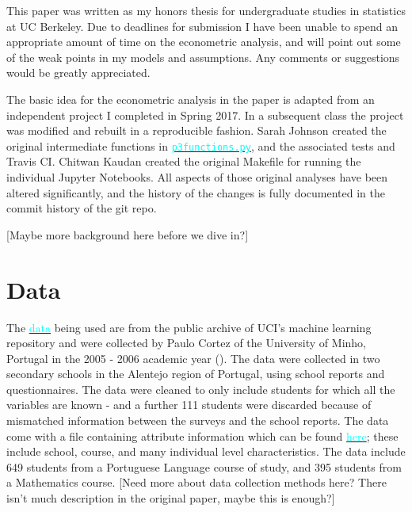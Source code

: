 \documentclass[12pt]{article}
\newcommand{\inlinecode}{\texttt}
\begin{document}
This paper was written as my honors thesis for undergraduate studies in statistics at UC Berkeley. Due to deadlines for submission I have been unable to spend an appropriate amount of time on the econometric analysis, and will point out some of the weak points in my models and assumptions. Any comments or suggestions would be greatly appreciated. 

The basic idea for the econometric analysis in the paper is adapted from an independent project I completed in Spring 2017. In a subsequent class the project was modified and rebuilt in a reproducible fashion. Sarah Johnson created the original intermediate functions in \href{https://github.com/nadavtadelis/Reproducible_Metrics/blob/master/p3functions.py}{\textcolor{cyan}{\inlinecode{p3functions.py}}}, and the associated tests and Travis CI. Chitwan Kaudan created the original Makefile for running the individual Jupyter Notebooks. All aspects of those original analyses have been altered significantly, and the history of the changes is fully documented in the commit history of the git repo.

\textcolor{BrickRed}{[Maybe more background here before we dive in?]}


\newpage
\section{Data}
The \href{https://archive.ics.uci.edu/ml/datasets/Student+Performance#}{\textcolor{cyan}{data}} being used are from the public archive of UCI's machine learning repository and were collected by Paulo Cortez of the University of Minho, Portugal in the 2005 - 2006 academic year (\cite{data_paper}). The data were collected in two secondary schools in the Alentejo region of Portugal, using school reports and questionnaires. The data were cleaned to only include students for which all the variables are known - and a further 111 students were discarded because of mismatched information between the surveys and the school reports. The data come with a file containing attribute information which can be found \href{https://archive.ics.uci.edu/ml/datasets/Student+Performance#}{\textcolor{cyan}{here}}; these include school, course, and many individual level characteristics. The data include 649 students from a Portuguese Language course of study, and 395 students from a Mathematics course. \textcolor{BrickRed}{[Need more about data collection methods here? There isn't much description in the original paper, maybe this is enough?]}
\end{document}

